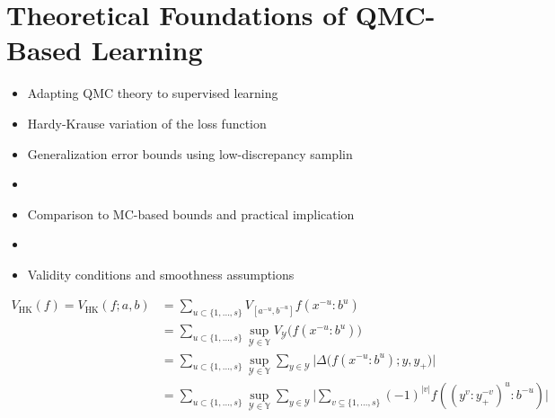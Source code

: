 \chapter{Theoretical Foundations of QMC-Based Learning}
\label{chapter5}

\begin{itemize}
    \item Adapting QMC theory to supervised learning
    \item Hardy-Krause variation of the loss function
    \item Generalization error bounds using low-discrepancy samplin\item 
    \item Comparison to MC-based bounds and practical implication\item 
    \item Validity conditions and smoothness assumptions
\end{itemize}

\begin{align*}
    V_{\mathrm{HK}}(f) = V_{\mathrm{HK}}(f; a, b) &= \sum_{u\subset \{1,\dots,s\}} V_{[a^{-u}, b^{-u}]} f(x^{-u}:b^u) \\
    &= \sum_{u\subset \{1,\dots,s\}} \sup_{\mathcal{Y} \in \mathbb{Y}} V_\mathcal{Y} \big( f(x^{-u} : b^u) \big) \\
    &= \sum_{u\subset \{1,\dots,s\}} \sup_{\mathcal{Y} \in \mathbb{Y}} \sum_{y\in\mathcal{Y}} \big| \Delta\big( f(x^{-u} : b^u); y, y_+ \big) \big| \\
    &= \sum_{u\subset \{1,\dots,s\}} \sup_{\mathcal{Y} \in \mathbb{Y}} \sum_{y\in\mathcal{Y}} \big| \sum_{v\subseteq \{1,\dots,s\}} (-1)^{|v|} f((y^v:y_+^{-v})^u:b^{-u}) \big| \\
\end{align*}





